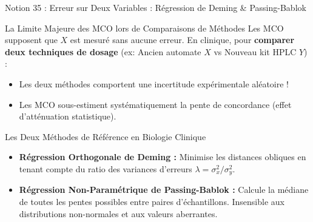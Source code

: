 \documentclass[aspectratio=169,10pt]{beamer}
\begin{document}
\begin{frame}{Notion 35 : Erreur sur Deux Variables : Régression de Deming \& Passing-Bablok}
  \begin{conceptbox}{La Limite Majeure des MCO lors de Comparaisons de Méthodes}
    \footnotesize
    Les MCO supposent que $X$ est mesuré sans aucune erreur.
    En clinique, pour \textbf{comparer deux techniques de dosage} (ex: Ancien automate $X$ vs Nouveau kit HPLC $Y$) :
    \begin{itemize}
      \item Les deux méthodes comportent une incertitude expérimentale aléatoire !
      \item Les MCO sous-estiment systématiquement la pente de concordance (effet d'atténuation statistique).
    \end{itemize}
  \end{conceptbox}
  \vspace{1mm}
  \begin{biobox}{Les Deux Méthodes de Référence en Biologie Clinique}
    \footnotesize
    \begin{itemize}
      \item \textbf{Régression Orthogonale de Deming :} Minimise les distances obliques en tenant compte du ratio des variances d'erreurs $\lambda = \sigma_x^2 / \sigma_y^2$.
      \item \textbf{Régression Non-Paramétrique de Passing-Bablok :} Calcule la médiane de toutes les pentes possibles entre paires d'échantillons. Insensible aux distributions non-normales et aux valeurs aberrantes.
    \end{itemize}
  \end{biobox}
\end{frame}
\end{document}
